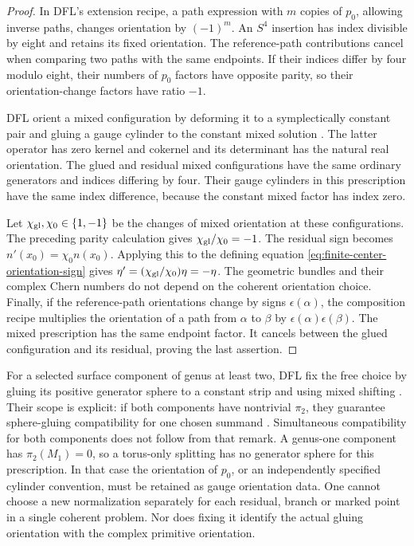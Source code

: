 \documentclass[11pt]{amsart}
\theoremstyle{definition}
\theoremstyle{remark}
\theoremstyle{plain}
\begin{document}
\begin{proof}
In DFL's extension recipe, a path expression with $m$ copies
of $p_0$, allowing inverse paths, changes orientation by
$(-1)^m$. An $S^4$ insertion has index divisible by eight
and retains its fixed orientation. The reference-path
contributions cancel when comparing two paths with the
same endpoints. If their indices differ by four modulo
eight, their numbers of $p_0$ factors have opposite parity,
so their orientation-change factors have ratio $-1$.

DFL orient a mixed configuration by deforming it to a
symplectically constant pair and gluing a gauge cylinder
to the constant mixed solution
\cite[Section~4.7, pp.~59--60]{DaeFukLip21a}.
The latter operator has zero kernel and cokernel and its
determinant has the natural real orientation. The glued
and residual mixed configurations have the same ordinary
generators and indices differing by four. Their gauge
cylinders in this prescription have the same index
difference, because the constant mixed factor has index zero.

Let $\chi_{\rm gl},\chi_0\in\{1,-1\}$ be the changes of
mixed orientation at these configurations. The preceding
parity calculation gives $\chi_{\rm gl}/\chi_0=-1$.
The residual sign becomes $n'(x_0)=\chi_0n(x_0)$.
Applying this to the defining equation
\eqref{eq:finite-center-orientation-sign} gives
$\eta'=(\chi_{\rm gl}/\chi_0)\eta=-\eta$.
The geometric bundles and their complex Chern numbers do
not depend on the coherent orientation choice.
Finally, if the reference-path orientations change by signs
$\epsilon(\alpha)$, the composition recipe multiplies the
orientation of a path from $\alpha$ to $\beta$ by
$\epsilon(\alpha)\epsilon(\beta)$. The mixed prescription
has the same endpoint factor. It cancels between the glued
configuration and its residual, proving the last assertion.
\end{proof}

For a selected surface component of genus at least two,
DFL fix the free choice by gluing its positive generator
sphere to a constant strip and using mixed shifting
\cite[Remark~4.76]{DaeFukLip21a}. Their scope is explicit:
if both components have nontrivial $\pi_2$, they guarantee
sphere-gluing compatibility for one chosen summand
\cite[Remark~2.39, pp.~16--17]{DaeFukLip21a}.
Simultaneous compatibility for both components does not
follow from that remark. A genus-one component has
$\pi_2(M_1)=0$, so a torus-only splitting has no generator
sphere for this prescription. In that case the orientation
of $p_0$, or an independently specified cylinder convention,
must be retained as gauge orientation data.
One cannot choose a new normalization separately for
each residual, branch or marked point in a single coherent
problem. Nor does fixing it identify the actual gluing
orientation with the complex primitive orientation.
\end{document}
